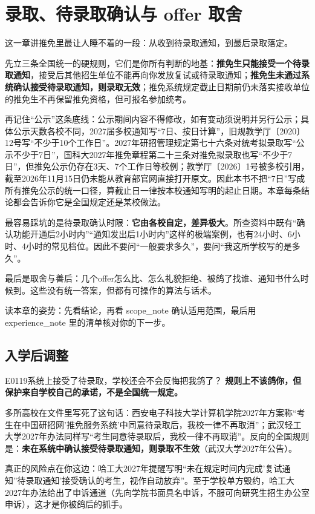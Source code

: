 \chapter{录取、待录取确认与 offer 取舍}
\label{ch11}
\begin{keybox}
这一章讲推免里最让人睡不着的一段：从收到待录取通知，到最后录取落定。

先立三条全国统一的硬规则，它们是你所有判断的地基：\textbf{推免生只能接受一个待录取通知}，接受后其他招生单位不能再向你发放复试或待录取通知；\textbf{推免生未通过系统确认接受待录取通知，则录取无效}；推免系统规定截止日期前仍未落实接收单位的推免生不再保留推免资格，但可报名参加统考。

再记住“公示”这条底线：公示期间内容不得修改，如有变动须说明并另行公示；具体公示天数各校不同，2027届多校通知写“7日、按日计算”，旧规教学厅〔2020〕12号写“不少于10个工作日”。2027年研招管理规定第七十六条对统考拟录取写“公示不少于7日”，国科大2027年推免章程第二十三条对推免拟录取也写“不少于7日”，但推免公示仍存在3天、7个工作日等校例；教学厅〔2026〕1号被多校引用，截至2026年11月15日仍未能从教育部官网直接打开原文。因此本书不把“7日”写成所有推免公示的统一口径，算截止日一律按本校通知写明的起止日期。本章每条结论都会告诉你它是全国规定还是某校做法。

最容易踩坑的是待录取确认时限：\textbf{它由各校自定，差异极大}。所查资料中既有“确认功能开通后2小时内”“通知发出后1小时内”这样的极端案例，也有24小时、6小时、4小时的常见档位。因此不要问“一般要求多久”，要问“我这所学校写的是多久”。

最后是取舍与善后：几个offer怎么比、怎么礼貌拒绝、被鸽了找谁、通知书什么时候到。这些没有统一答案，但都有可操作的算法与话术。

读本章的姿势：先看结论，再看 scope\_note 确认适用范围，最后用 experience\_note 里的清单核对你的下一步。
\end{keybox}

\section{入学后调整}
\begin{qa}{E0119}{系统上接受了待录取，学校还会不会反悔把我鸽了？}
\textbf{规则上不该鸽你，但保护来自学校自己的承诺，不是全国统一规定。}

多所高校在文件里写死了这句话：西安电子科技大学计算机学院2027年方案称“考生在中国研招网'推免服务系统'中同意待录取后，我校一律不再取消”；武汉轻工大学2027年办法同样写“考生同意待录取后，我校一律不再取消”。反向的全国规则是：\textbf{未在系统中确认接受待录取通知，则录取不生效}（武汉大学2027年公告）。

真正的风险点在你这边：哈工大2027年提醒写明“未在规定时间内完成'复试通知''待录取通知'接受确认的考生，视作自动放弃”。至于学校单方毁约，哈工大2027年办法给出了申诉通道（先向学院书面具名申诉，不服可向研究生招生办公室申诉），这才是你被鸽后的抓手。
\end{qa}

